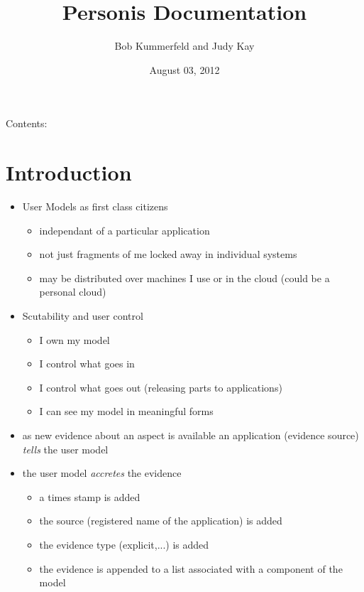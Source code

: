 \documentclass[letterpaper,10pt,english]{sphinxmanual}
\title{Personis Documentation}
\date{August 03, 2012}
\author{Bob Kummerfeld and Judy Kay}
\begin{document}
\maketitle
\tableofcontents
{}\label{index::doc}


Contents:


\chapter{Introduction}
\label{Intro:introduction}\label{Intro::doc}\label{Intro:personis-user-modeling-framework}\begin{itemize}
\item {} 
User Models as first class citizens
\begin{itemize}
\item {} 
independant of a particular application

\item {} 
not just fragments of me locked away in individual systems

\item {} 
may be distributed over machines I use or in the cloud (could be a personal cloud)

\end{itemize}

\item {} 
Scutability and user control
\begin{itemize}
\item {} 
I own my model

\item {} 
I control what goes in

\item {} 
I control what goes out (releasing parts to applications)

\item {} 
I can see my model in meaningful forms

\end{itemize}

\item {} 
as new evidence about an aspect is available an application (evidence source) \emph{tells} the user model

\item {} 
the user model \emph{accretes} the evidence
\begin{itemize}
\item {} 
a times stamp is added

\item {} 
the source (registered name of the application) is added

\item {} 
the evidence type (explicit,...) is added

\item {} 
the evidence is appended to a list associated with a component of the model

\end{itemize}

\end{itemize}
\end{document}
